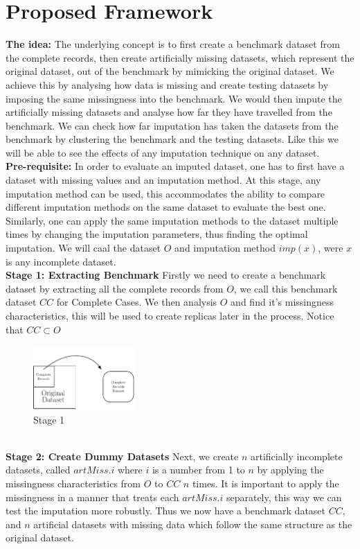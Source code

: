 \documentclass{IEEEconf}
\begin{document}
	\section{Proposed Framework} %
	\label{sec:proposed_framework}
		\textbf{The idea:} The underlying concept is to first create a benchmark dataset from the complete records, then create artificially missing datasets, which represent the original dataset, out of the benchmark by mimicking the original dataset. We achieve this by analysing how data is missing and create testing datasets by imposing the same missingness into the benchmark. We would then impute the artificially missing datasets and analyse how far they have travelled from the benchmark. We can check how far imputation has taken the datasets from the benchmark by clustering the benchmark and the testing datasets. Like this we will be able to see the effects of any imputation technique on any dataset. 
		\\
		\indent \textbf{Pre-requisite:}
		In order to evaluate an imputed dataset, one has to first have a dataset with missing values and an imputation method. At this stage, any imputation method can be used, this accommodates the ability to compare different imputation methods on the same dataset to evaluate the best one. Similarly, one can apply the same imputation methods to the dataset multiple times by changing the imputation parameters, thus finding the optimal imputation. We will caal the dataset $O$ and imputation method $imp(x)$, were $x$ is any incomplete dataset.
		\\
		\indent \textbf{Stage 1: Extracting Benchmark}
		Firstly we need to create a benchmark dataset by extracting all the complete records from $O$, we call this benchmark dataset $CC$ for Complete Cases. We then analysis $O$ and find it's missingness characteristics, this will be used to create replicas later in the process. Notice that $ CC \subset O$ 
		\begin{figure}[!ht]
			\caption{Stage 1}
			\centering
			\includegraphics[width=0.35\textwidth]{stage1.pdf}
		\end{figure}
		\\
		\indent \textbf{Stage 2: Create Dummy Datasets}
		Next, we create $n$ artificially incomplete datasets, called $artMiss.i$ where $i$ is a number from 1 to $n$ by applying the missingness characteristics from $O$ to $CC$ $n$ times. It is important to apply the missingness in a manner that treats each $artMiss.i$ separately, this way we can test the imputation more robustly. Thus we now have a benchmark dataset $CC$, and $n$ artificial datasets with missing data which follow the same structure as the original dataset.
\end{document}
